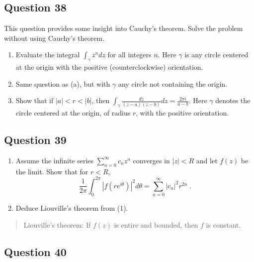 \documentclass[12pt]{article}
\begin{document}
\hypertarget{question-38-2}{%
\subsection{Question 38}\label{question-38-2}}

This question provides some insight into Cauchy's theorem. Solve the
problem without using Cauchy's theorem.

\begin{enumerate}
\def\labelenumi{\arabic{enumi}.}
\item
  Evaluate the integral \(\displaystyle{\int_{\gamma} z^n dz}\) for all
  integers \(n\). Here \(\gamma\) is any circle centered at the origin
  with the positive (counterclockwise) orientation.
\item
  Same question as (a), but with \(\gamma\) any circle not containing
  the origin.
\item
  Show that if \(|a|<r<|b|\), then
  \(\displaystyle{\int_{\gamma}\frac{dz}{(z-a)(z-b)} dz=\frac{2\pi i}{a-b}}\).
  Here \(\gamma\) denotes the circle centered at the origin, of radius
  \(r\), with the positive orientation.
\end{enumerate}

\hypertarget{question-39-2}{%
\subsection{Question 39}\label{question-39-2}}

\begin{enumerate}
\def\labelenumi{(\arabic{enumi})}
\item
  Assume the infinite series \(\displaystyle \sum_{n=0}^\infty c_n z^n\)
  converges in \(|z| < R\) and let \(f(z)\) be the limit. Show that for
  \(r <R\),
  \[\frac{1}{2 \pi} \int_0^{2 \pi} |f(r e^{i \theta})|^2 d \theta =
  \sum_{n=0}^\infty |c_n|^2 r^{2n} \; .\]
\item
  Deduce Liouville's theorem from (1).
\end{enumerate}

\begin{quote}
Liouville's theorem: If \(f(z)\) is entire and bounded, then \(f\) is
constant.
\end{quote}

\hypertarget{question-40-2}{%
\subsection{Question 40}\label{question-40-2}}
\end{document}
